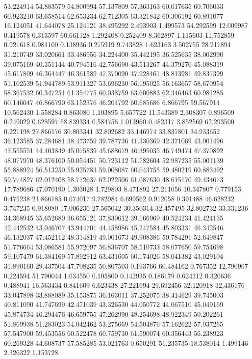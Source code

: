 53.224914
54.883579
54.800994
57.137809
57.363163
60.017635
60.706033
60.923210
63.658514
62.653234
62.712305
63.321842
60.306192
60.891077
16.124051
41.644078
25.124121
38.495292
2.493903
1.499573
54.292599
12.009987
0.419578
0.313597
60.661128
1.292408
0.252409
8.362897
1.115603
11.752859
0.921618
0.981100
0.138936
0.275919
9.743828
1.623163
3.502755
28.217894
31.210749
33.020661
33.486956
34.224400
35.442195
36.525635
38.002990
39.075169
40.351144
40.794516
42.756690
43.513267
44.379270
45.088319
45.617809
46.364447
46.361589
47.370090
47.928461
48.813981
49.837399
51.102539
51.944789
53.911327
53.696230
56.195025
56.163657
58.670954
58.367532
60.347251
61.354775
60.038759
63.600883
62.346463
60.981285
60.146047
46.866790
63.152376
46.204792
60.685686
6.866795
59.567914
10.562430
1.558284
0.863080
1.103895
5.657722
11.543389
2.308307
0.896509
0.249029
0.628597
68.839334
0.584756
1.013960
0.482317
3.852569
62.293500
0.221198
27.866176
30.803341
32.802682
33.146974
33.837801
34.933652
36.123585
37.284681
38.473759
39.787736
41.330369
42.371069
43.001496
43.555551
44.403849
45.075839
45.688679
46.395035
46.749474
47.370892
48.077970
48.376100
50.054451
50.723112
51.782604
52.987235
55.001139
55.888924
56.513250
55.925783
59.008087
60.043755
59.480219
60.883492
59.774827
62.012408
58.772637
62.022506
61.087630
48.615170
49.434673
17.789686
47.070190
1.303028
1.729803
8.471892
27.211056
10.347807
0.779153
0.475238
21.866185
0.674017
9.782984
6.699562
0.912058
0.391488
46.628232
3.747235
0.918080
17.006236
27.565042
30.350314
32.457495
32.802732
33.331236
34.368945
35.652680
36.655121
37.830612
39.166969
40.524234
41.424135
42.442532
43.046707
43.944701
44.458986
45.247584
45.803331
46.342546
46.132037
47.452112
48.314819
49.001673
49.908386
50.784291
52.649847
51.776664
53.086581
55.972097
56.836707
58.510733
58.077650
59.754698
59.107479
61.384169
57.892912
63.431605
60.174026
58.041382
43.029104
31.890160
29.437504
47.708235
50.807503
0.193766
60.484162
0.767352
12.790967
0.224594
51.790044
1.634550
0.105800
0.142935
0.186179
0.624312
0.320636
0.488941
16.563434
0.841609
6.623438
27.221694
29.692456
32.120918
32.436176
33.047898
33.888089
35.153875
36.163011
37.252075
38.414629
39.745003
40.811090
41.747699
42.471039
43.326530
44.050772
44.067510
45.049169
45.874734
46.294476
46.659755
47.262990
48.254698
48.922349
50.202261
51.869938
51.283023
54.042462
53.275669
54.504876
57.162622
57.937265
57.547900
59.453556
60.522478
60.759730
61.590074
60.356443
56.238923
60.269328
44.608737
57.585285
53.021763
0.650291
51.235735
18.538014
1.499146
2.326322
1.153728
